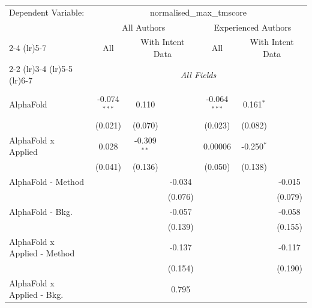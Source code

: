 \begingroup
\centering
\begin{tabular}{lcccccc}
   \tabularnewline \midrule \midrule
   Dependent Variable: & \multicolumn{6}{c}{normalised\_max\_tmscore}\\
 & \multicolumn{3}{c}{All Authors} & \multicolumn{3}{c}{Experienced Authors} \\
\cmidrule(lr){2-4} \cmidrule(lr){5-7}
 & \multicolumn{1}{c}{All} & \multicolumn{2}{c}{With Intent Data} & \multicolumn{1}{c}{All} & \multicolumn{2}{c}{With Intent Data} \\
\cmidrule(lr){2-2} \cmidrule(lr){3-4} \cmidrule(lr){5-5} \cmidrule(lr){6-7}
 & \multicolumn{6}{c}{\textit{All Fields}} \\ \\
   AlphaFold                      & -0.074$^{***}$ & 0.110          &              & -0.064$^{***}$ & 0.161$^{*}$   &   \\   
                                  & (0.021)        & (0.070)        &              & (0.023)        & (0.082)       &   \\   
   AlphaFold x Applied            & 0.028          & -0.309$^{**}$  &              & 0.00006        & -0.250$^{*}$  &   \\   
                                  & (0.041)        & (0.136)        &              & (0.050)        & (0.138)       &   \\   
   AlphaFold - Method             &                &                & -0.034       &                &               & -0.015\\   
                                  &                &                & (0.076)      &                &               & (0.079)\\   
   AlphaFold - Bkg.               &                &                & -0.057       &                &               & -0.058\\   
                                  &                &                & (0.139)      &                &               & (0.155)\\   
   AlphaFold x Applied - Method   &                &                & -0.137       &                &               & -0.117\\   
                                  &                &                & (0.154)      &                &               & (0.190)\\   
   AlphaFold x Applied - Bkg.     &                &                & 0.795        &                &               &   \\   

\end{tabular}
